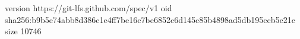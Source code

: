 version https://git-lfs.github.com/spec/v1
oid sha256:b9b5e74abb8d386c1e4ff7be16c7be6852c6d145c85b4898ad5db195ccb5c21c
size 10746
